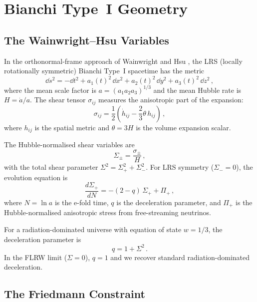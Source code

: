 \section{Bianchi Type~I Geometry}\label{sec:geometry}

\subsection{The Wainwright--Hsu Variables}

In the orthonormal-frame approach of Wainwright and Hsu \cite{WainwrightEllis1997}, the LRS (locally rotationally symmetric) Bianchi Type~I spacetime has the metric
\begin{equation}
\dd s^2 = -\dd t^2 + a_1(t)^2\,\dd x^2 + a_2(t)^2\,\dd y^2 + a_3(t)^2\,\dd z^2\,,
\end{equation}
where the mean scale factor is $a = (a_1 a_2 a_3)^{1/3}$ and the mean Hubble rate is $H = \dot{a}/a$.  The shear tensor $\sigma_{ij}$ measures the anisotropic part of the expansion:
\begin{equation}
\sigma_{ij} = \frac{1}{2}(\dot{h}_{ij} - \frac{2}{3}\theta\,h_{ij})\,,
\end{equation}
where $h_{ij}$ is the spatial metric and $\theta = 3H$ is the volume expansion scalar.

The Hubble-normalised shear variables are
\begin{equation}
\Sigma_\pm = \frac{\sigma_\pm}{H}\,,
\end{equation}
with the total shear parameter $\Sigma^2 = \Sigma_+^2 + \Sigma_-^2$.  For LRS symmetry ($\Sigma_- = 0$), the evolution equation is
\begin{equation}
\frac{d\Sigma_+}{dN} = -(2-q)\,\Sigma_+ + \Pi_+\,,\label{eq:dSp}
\end{equation}
where $N = \ln a$ is the e-fold time, $q$ is the deceleration parameter, and $\Pi_+$ is the Hubble-normalised anisotropic stress from free-streaming neutrinos.

For a radiation-dominated universe with equation of state $w = 1/3$, the deceleration parameter is
\begin{equation}
q = 1 + \Sigma^2\,.
\end{equation}
In the FLRW limit ($\Sigma = 0$), $q = 1$ and we recover standard radiation-dominated deceleration.

\subsection{The Friedmann Constraint}

